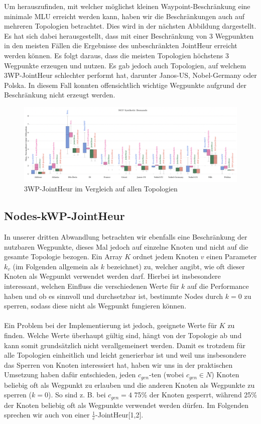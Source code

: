 \documentclass[sigconf,noacm,review]{acmart}
\begin{document}
Um herauszufinden, mit welcher möglichst kleinen Waypoint-Beschränkung eine minimale MLU erreicht werden kann, haben wir die Beschränkungen auch 
auf mehreren Topologien betrachtet. Dies wird in der nächsten Abbildung dargestellt. Es hat sich dabei herausgestellt, dass mit einer Beschränkung von 3 Wegpunkten in den meisten Fällen
die Ergebnisse des unbeschränkten JointHeur erreicht werden können. Es folgt daraus, dass die meisten Topologien höchstens 3 Wegpunkte erzeugen und nutzen.
Es gab jedoch auch Topologien, auf welchem  3WP-JointHeur schlechter performt hat, darunter Janos-US, Nobel-Germany oder Polska. In diesem Fall
konnten offensichtlich wichtige Wegpunkte aufgrund der Beschränkung nicht erzeugt werden.
\begin{figure}[h]
  \centering
  \includegraphics[width=\linewidth]{abbildungen/allTopologieskwp}
  \caption{3WP-JointHeur im Vergleich auf allen Topologien}
\end{figure}

\subsection{Nodes-kWP-JointHeur}
In unserer dritten Abwandlung betrachten wir ebenfalls eine Beschränkung der nutzbaren Wegpunkte, dieses Mal jedoch auf einzelne Knoten und nicht auf die gesamte Topologie bezogen.
Ein Array $K$ ordnet jedem Knoten $v$ einen Parameter $k_v$ (im Folgenden allgemein als $k$ bezeichnet) zu, welcher angibt, wie oft dieser Knoten als Wegpunkt verwendet werden darf. Hierbei ist insbesondere interessant, welchen Einfluss die verschiedenen Werte für $k$ auf die Performance haben und ob es sinnvoll und durchsetzbar ist, bestimmte Nodes durch $k=0$ zu sperren, sodass diese nicht als Wegpunkt fungieren können.
\\
\\
Ein Problem bei der Implementierung ist jedoch, geeignete Werte für $K$ zu finden. Welche Werte überhaupt gültig sind, hängt von der Topologie ab und kann somit grundsätzlich nicht verallgemeinert werden. Damit es trotzdem für alle Topologien einheitlich und leicht generierbar ist und weil uns insbesondere das Sperren von Knoten interessiert hat, haben wir uns in der praktischen Umsetzung haben dafür entschieden, jeden $c_{gen}$-ten (wobei $c_{gen} \in N$) Knoten beliebig oft als Wegpunkt zu erlauben und die anderen Knoten als Wegpunkte zu sperren ($k=0$). So sind z. B. bei  $c_{gen} = 4$ 75\% der Knoten gesperrt, während 25\% der Knoten beliebig oft als Wegpunkte verwendet werden dürfen. Im Folgenden sprechen wir auch von einer $\frac{1}{c}$-JointHeur[1,2].
\end{document}
